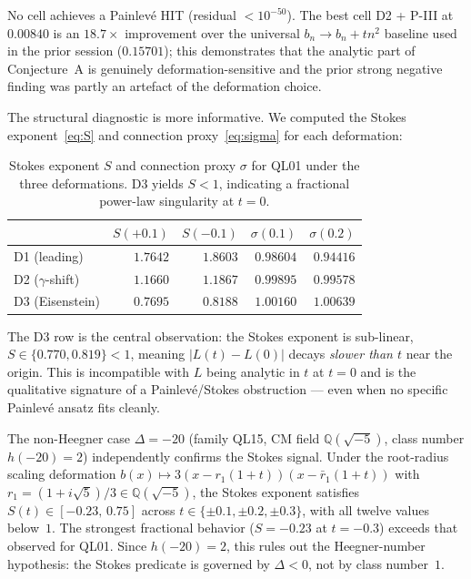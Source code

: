 \documentclass[12pt]{amsart}
\theoremstyle{definition}
\begin{document}
No cell achieves a Painlev\'e HIT (residual $<10^{-50}$). The best cell
D2 + P-III at $0.00840$ is an $18.7\times$ improvement over the
universal $b_{n}\to b_{n}+tn^{2}$ baseline used in the prior session
($0.15701$); this demonstrates that the analytic part of Conjecture~A is
genuinely deformation-sensitive and the prior strong negative finding was
partly an artefact of the deformation choice.

The structural diagnostic is more informative. We computed the Stokes
exponent~\eqref{eq:S} and connection proxy~\eqref{eq:sigma} for each
deformation:
\begin{table}[h]
\centering
\begin{tabular}{lrrrr}
\toprule
            & $S(+0.1)$ & $S(-0.1)$ & $\sigma(0.1)$ & $\sigma(0.2)$ \\
\midrule
D1 (leading)    & $1.7642$ & $1.8603$ & $0.98604$ & $0.94416$ \\
D2 ($\gamma$-shift) & $1.1660$ & $1.1867$ & $0.99895$ & $0.99578$ \\
D3 (Eisenstein) & $0.7695$ & $0.8188$ & $1.00160$ & $1.00639$ \\
\bottomrule
\end{tabular}
\caption{Stokes exponent $S$ and connection proxy $\sigma$ for QL01
under the three deformations. D3 yields $S<1$, indicating a fractional
power-law singularity at $t=0$.}
\label{tab:diagnostics}
\end{table}

\noindent The D3 row is the central observation: the Stokes exponent
is sub-linear, $S\in\{0.770,0.819\}<1$, meaning $|L(t)-L(0)|$ decays
\emph{slower than $t$} near the origin. This is incompatible with $L$
being analytic in $t$ at $t=0$ and is the qualitative signature of a
Painlev\'e/Stokes obstruction --- even when no specific Painlev\'e ansatz
fits cleanly.

The non-Heegner case $\Delta=-20$ (family QL15, CM field
$\mathbb{Q}(\sqrt{-5})$, class number $h(-20)=2$) independently
confirms the Stokes signal. Under the root-radius scaling deformation
$b(x)\mapsto 3(x-r_{1}(1+t))(x-\bar{r}_{1}(1+t))$ with
$r_{1}=(1+i\sqrt{5})/3\in\mathbb{Q}(\sqrt{-5})$, the Stokes
exponent satisfies $S(t)\in[-0.23,\,0.75]$ across
$t\in\{\pm 0.1,\pm 0.2,\pm 0.3\}$, with all twelve values
below~$1$. The strongest fractional behavior ($S=-0.23$ at $t=-0.3$)
exceeds that observed for QL01. Since $h(-20)=2$, this rules out
the Heegner-number hypothesis: the Stokes predicate is governed by
$\Delta<0$, not by class number~$1$.
\end{document}
